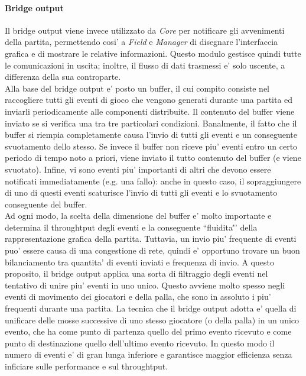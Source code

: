 \paragraph{Bridge output}\label{sec:analisi_distribuzione_bridge_output} Il bridge output viene invece utilizzato da \textit{Core} per notificare gli avvenimenti della partita, permettendo cosi' a \textit{Field} e \textit{Manager} di disegnare l'interfaccia grafica e di mostrare le relative informazioni. Questo modulo gestisce quindi tutte le comunicazioni in uscita; inoltre, il flusso di dati trasmessi e' solo uscente, a differenza della sua controparte.\\

Alla base del bridge output e' posto un buffer, il cui compito consiste nel raccogliere tutti gli eventi di gioco che vengono generati durante una partita ed inviarli periodicamente alle componenti distribuite. Il contenuto del buffer viene inviato se si verifica una tra tre particolari condizioni. Banalmente, il fatto che il buffer si riempia completamente causa l'invio di tutti gli eventi e un conseguente svuotamento dello stesso. Se invece il buffer non riceve piu' eventi entro un certo periodo di tempo noto a priori, viene inviato il tutto contenuto del buffer (e viene svuotato). Infine, vi sono eventi piu' importanti di altri che devono essere notificati immediatamente (e.g. una fallo): anche in questo caso, il sopraggiungere di uno di questi eventi scaturisce l'invio di tutti gli eventi e lo svuotamento conseguente del buffer.\\

Ad ogni modo, la scelta della dimensione del buffer e' molto importante e determina il throughtput degli eventi e la conseguente ``fluidita\''' della rappresentazione grafica della partita. Tuttavia, un invio piu' frequente di eventi puo' essere causa di una congestione di rete, quindi e' opportuno trovare un buon bilanciamento tra quantita' di eventi inviati e frequenza di invio. A questo proposito, il bridge output applica una sorta di filtraggio degli eventi nel tentativo di unire piu' eventi in uno unico. Questo avviene molto spesso negli eventi di movimento dei giocatori e della palla, che sono in assoluto i piu' frequenti durante una partita. La tecnica che il bridge output adotta e' quella di unificare delle mosse successive di uno stesso giocatore (o della palla) in un unico evento, che ha come punto di partenza quello del primo evento ricevuto e come punto di destinazione quello dell'ultimo evento ricevuto. In questo modo il numero di eventi e' di gran lunga inferiore e garantisce maggior efficienza senza inficiare sulle performance e sul throughtput.

